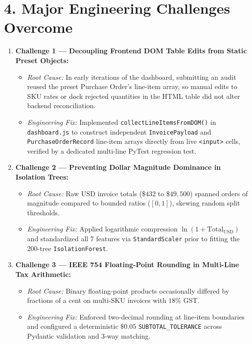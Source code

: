 \documentclass[a4paper,10pt]{article}
\begin{document}
\section{4. Major Engineering Challenges Overcome}
\begin{enumerate}[leftmargin=0.22in, itemsep=4pt]
    \item \textbf{Challenge 1 --- Decoupling Frontend DOM Table Edits from Static Preset Objects:}
    \begin{itemize}[leftmargin=0.18in, itemsep=1pt]
        \item \textit{Root Cause:} In early iterations of the dashboard, submitting an audit reused the preset Purchase Order's line-item array, so manual edits to SKU rates or dock rejected quantities in the HTML table did not alter backend reconciliation.
        \item \textit{Engineering Fix:} Implemented \texttt{collectLineItemsFromDOM()} in \texttt{dashboard.js} to construct independent \texttt{InvoicePayload} and \texttt{PurchaseOrderRecord} line-item arrays directly from live \texttt{<input>} cells, verified by a dedicated multi-line PyTest regression test.
    \end{itemize}
    \item \textbf{Challenge 2 --- Preventing Dollar Magnitude Dominance in Isolation Trees:}
    \begin{itemize}[leftmargin=0.18in, itemsep=1pt]
        \item \textit{Root Cause:} Raw USD invoice totals ($\$432$ to $\$49{,}500$) spanned orders of magnitude compared to bounded ratios ($[0,1]$), skewing random split thresholds.
        \item \textit{Engineering Fix:} Applied logarithmic compression $\ln(1 + \text{Total}_{\text{USD}})$ and standardized all 7 features via \texttt{StandardScaler} prior to fitting the 200-tree \texttt{IsolationForest}.
    \end{itemize}
    \item \textbf{Challenge 3 --- IEEE 754 Floating-Point Rounding in Multi-Line Tax Arithmetic:}
    \begin{itemize}[leftmargin=0.18in, itemsep=1pt]
        \item \textit{Root Cause:} Binary floating-point products occasionally differed by fractions of a cent on multi-SKU invoices with $18\%$ GST.
        \item \textit{Engineering Fix:} Enforced two-decimal rounding at line-item boundaries and configured a deterministic $\$0.05$ \texttt{SUBTOTAL\_TOLERANCE} across Pydantic validation and 3-way matching.

\end{itemize}
\end{enumerate}
\end{document}
